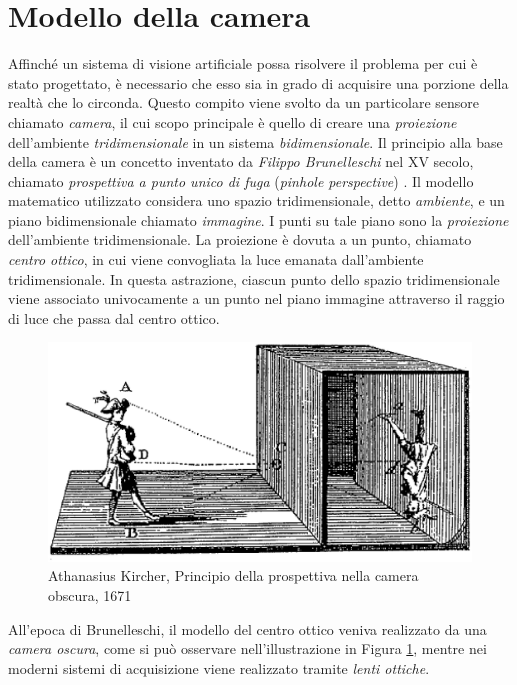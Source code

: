 \section{Modello della camera}
\label{modelloCamera}
Affinch\'e un sistema di visione artificiale possa risolvere il problema per cui \`e stato progettato, \`e necessario che esso sia in grado di acquisire una porzione della realt\`a che lo circonda.
Questo compito viene svolto da un particolare sensore chiamato \textit{camera}, il cui scopo principale \`e quello di creare una \textit{proiezione} dell'ambiente \textit{tridimensionale} in un sistema \textit{bidimensionale}.
Il principio alla base della camera \`e un concetto inventato da \textit{Filippo Brunelleschi} nel XV secolo, chiamato \textit{prospettiva a punto unico di fuga} (\textit{pinhole perspective}) \cite{manetti1976vita}.
Il modello matematico utilizzato considera uno spazio tridimensionale, detto \textit{ambiente}, e un piano bidimensionale chiamato \textit{immagine}. 
I punti su tale piano sono la \textit{proiezione} dell'ambiente tridimensionale.
La proiezione \`e dovuta a un punto, chiamato \textit{centro ottico}, in cui viene convogliata la luce emanata dall'ambiente tridimensionale.
In questa astrazione, ciascun punto dello spazio tridimensionale viene associato univocamente a un punto nel piano immagine attraverso il raggio di luce che passa dal centro ottico.
\begin{figure}[tb]
	\centering
	\includegraphics[width=12cm]{./pictures/cameraObscura}
	\caption[Athanasius Kircher, Principio della prospettiva nella camera obscura, 1671]{Athanasius Kircher, Principio della prospettiva nella camera obscura, 1671}
	\label{fig:prospettiva}
\end{figure} 
All'epoca di Brunelleschi, il modello del centro ottico veniva realizzato da una \textit{camera oscura}, come si pu\`o osservare nell'illustrazione in Figura \ref{fig:prospettiva}, mentre nei moderni sistemi di acquisizione viene realizzato tramite \textit{lenti ottiche}. 
